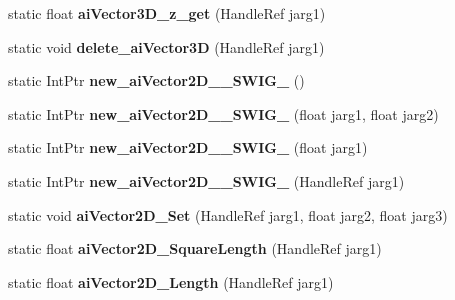 \begin{DoxyCompactItemize}
\item 
\hypertarget{class_assimp_p_i_n_v_o_k_e_a19aa89120fb98da1ad4cc63ecad80a5a}{static float {\bfseries ai\+Vector3\+D\+\_\+z\+\_\+get} (Handle\+Ref jarg1)}\label{class_assimp_p_i_n_v_o_k_e_a19aa89120fb98da1ad4cc63ecad80a5a}

\item 
\hypertarget{class_assimp_p_i_n_v_o_k_e_a15d5336ea64470b3f1a313e3f2ffe467}{static void {\bfseries delete\+\_\+ai\+Vector3\+D} (Handle\+Ref jarg1)}\label{class_assimp_p_i_n_v_o_k_e_a15d5336ea64470b3f1a313e3f2ffe467}

\item 
\hypertarget{class_assimp_p_i_n_v_o_k_e_a4bc8cd07df7236f1c1d439376b9ac438}{static Int\+Ptr {\bfseries new\+\_\+ai\+Vector2\+D\+\_\+\+\_\+\+S\+W\+I\+G\+\_} ()}\label{class_assimp_p_i_n_v_o_k_e_a4bc8cd07df7236f1c1d439376b9ac438}

\item 
\hypertarget{class_assimp_p_i_n_v_o_k_e_a2ae59173995bc5be628071cbde83e5d6}{static Int\+Ptr {\bfseries new\+\_\+ai\+Vector2\+D\+\_\+\+\_\+\+S\+W\+I\+G\+\_} (float jarg1, float jarg2)}\label{class_assimp_p_i_n_v_o_k_e_a2ae59173995bc5be628071cbde83e5d6}

\item 
\hypertarget{class_assimp_p_i_n_v_o_k_e_a45f3f55505f233c12a0aa0944d2e93c0}{static Int\+Ptr {\bfseries new\+\_\+ai\+Vector2\+D\+\_\+\+\_\+\+S\+W\+I\+G\+\_} (float jarg1)}\label{class_assimp_p_i_n_v_o_k_e_a45f3f55505f233c12a0aa0944d2e93c0}

\item 
\hypertarget{class_assimp_p_i_n_v_o_k_e_a4ad44e1e43bee402d42ea6201edf54c0}{static Int\+Ptr {\bfseries new\+\_\+ai\+Vector2\+D\+\_\+\+\_\+\+S\+W\+I\+G\+\_} (Handle\+Ref jarg1)}\label{class_assimp_p_i_n_v_o_k_e_a4ad44e1e43bee402d42ea6201edf54c0}

\item 
\hypertarget{class_assimp_p_i_n_v_o_k_e_a4508d20fb08c9512550b7573a182c9d6}{static void {\bfseries ai\+Vector2\+D\+\_\+\+Set} (Handle\+Ref jarg1, float jarg2, float jarg3)}\label{class_assimp_p_i_n_v_o_k_e_a4508d20fb08c9512550b7573a182c9d6}

\item 
\hypertarget{class_assimp_p_i_n_v_o_k_e_aef74d849d29f31e983b6dbcf50ebee77}{static float {\bfseries ai\+Vector2\+D\+\_\+\+Square\+Length} (Handle\+Ref jarg1)}\label{class_assimp_p_i_n_v_o_k_e_aef74d849d29f31e983b6dbcf50ebee77}

\item 
\hypertarget{class_assimp_p_i_n_v_o_k_e_a58d482c3b01864b9418e9613a2a831e2}{static float {\bfseries ai\+Vector2\+D\+\_\+\+Length} (Handle\+Ref jarg1)}\label{class_assimp_p_i_n_v_o_k_e_a58d482c3b01864b9418e9613a2a831e2}


\end{DoxyCompactItemize}

